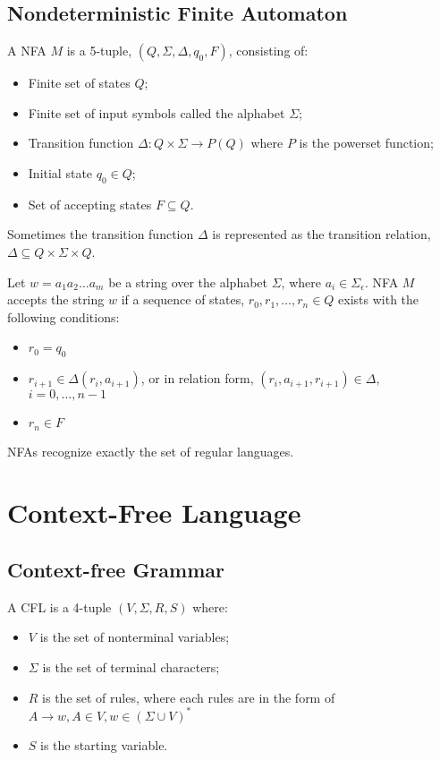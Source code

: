 \documentclass{report}
\begin{document}
		\subsection{Nondeterministic Finite Automaton}
			\begin{defn} \label{def_NFA}
				A NFA $M$ is a 5-tuple, $(Q,\Sigma,\Delta,q_0,F)$, consisting of:
				\begin{itemize}
					\item Finite set of states $Q$;
					\item Finite set of input symbols called the alphabet $\Sigma$;
					\item Transition function $\Delta: Q \times \Sigma \rightarrow P(Q)$ where $P$ is the powerset function;
					\item Initial state $q_0 \in Q$;
					\item Set of accepting states $F \subseteq Q$.
				\end{itemize}
				Sometimes the transition function $\Delta$ is represented as the transition relation, $\Delta \subseteq Q \times \Sigma \times Q$.
				
				Let $w=a_1a_2\dots a_m$ be a string over the alphabet $\Sigma$, where $a_i \in \Sigma_\epsilon$. NFA $M$ accepts the string $w$ if a sequence of states, $r_0,r_1,\dots,r_n \in Q$ exists with the following conditions:
				\begin{itemize}
					\item $r_0=q_0$
					\item $r_{i+1}\in \Delta (r_i,a_{i+1})$, or in relation form, $(r_i,a_{i+1},r_{i+1}) \in \Delta$, $i=0,\dots,n-1$
					\item $r_n \in F$
				\end{itemize}
			\end{defn}
			
			\begin{thm} \label{thm_NFA_RL}
				NFAs recognize exactly the set of regular languages.
			\end{thm}
	
	\section{Context-Free Language}
		\subsection{Context-free Grammar}
			\begin{defn} \label{def_cfl}
				A CFL is a 4-tuple $(V,\Sigma,R,S)$ where:
				\begin{itemize}
					\item $V$ is the set of nonterminal variables;
					\item $\Sigma$ is the set of terminal characters;
					\item $R$ is the set of rules, where each rules are in the form of $A\rightarrow w, A\in V, w\in (\Sigma \cup V)^*$
					\item $S$ is the starting variable.
				\end{itemize}
			\end{defn}
			
\end{document}
